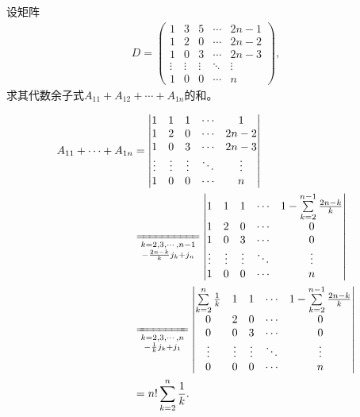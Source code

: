 \documentclass[../../main.tex]{subfiles}%
\begin{document}
\begin{example}
设矩阵
\begin{align*}
D = \begin{pmatrix}
1 & 3 & 5 & \cdots & 2n-1 \\
1 & 2 & 0 & \cdots & 2n-2 \\
1 & 0 & 3 & \cdots & 2n-3 \\
\vdots & \vdots & \vdots & \ddots & \vdots \\
1 & 0 & 0 & \cdots & n
\end{pmatrix},
\end{align*}
求其代数余子式$A_{11} + A_{12} + \cdots + A_{1n}$的和。
\end{example}
\begin{solution}

\begin{align*}
A_{11} + \cdots + A_{1n} &= \begin{vmatrix}
1 & 1 & 1 & \cdots & 1 \\
1 & 2 & 0 & \cdots & 2n-2 \\
1 & 0 & 3 & \cdots & 2n-3 \\
\vdots & \vdots & \vdots & \ddots & \vdots \\
1 & 0 & 0 & \cdots & n
\end{vmatrix} \\
&\xlongequal[\substack{k=2,3,\cdots,n-1 \\ -\frac{2n-k}{k}j_k + j_n}]{}
\begin{vmatrix}
1 & 1 & 1 & \cdots & 1-\sum\limits_{k=2}^{n-1}\frac{2n-k}{k} \\
1 & 2 & 0 & \cdots & 0 \\
1 & 0 & 3 & \cdots & 0 \\
\vdots & \vdots & \vdots & \ddots & \vdots \\
1 & 0 & 0 & \cdots & n
\end{vmatrix} \\
&\xlongequal[\substack{k=2,3,\cdots,n \\ -\frac{1}{k}j_k + j_1}]{}
\begin{vmatrix}
\sum\limits_{k=2}^{n}\frac{1}{k} & 1 & 1 & \cdots & 1-\sum\limits_{k=2}^{n-1}\frac{2n-k}{k} \\
0 & 2 & 0 & \cdots & 0 \\
0 & 0 & 3 & \cdots & 0 \\
\vdots & \vdots & \vdots & \ddots & \vdots \\
0 & 0 & 0 & \cdots & n
\end{vmatrix} \\
&= n! \sum\limits_{k=2}^{n}\frac{1}{k}.
\end{align*}

\end{solution}
\end{document}
